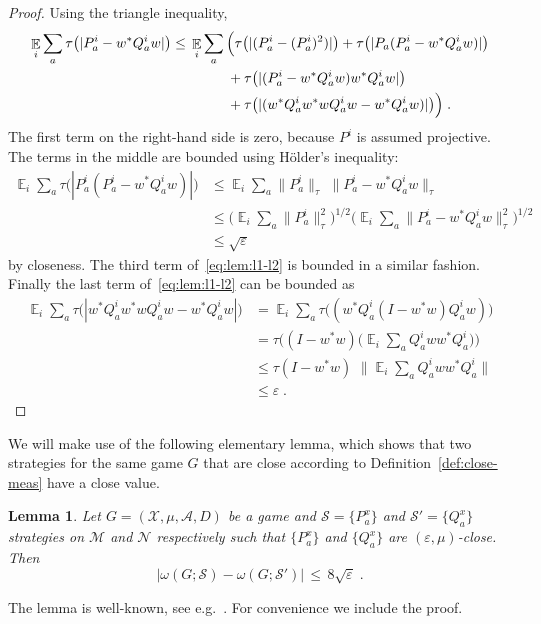 \documentclass[11pt]{article}
\newtheorem{lemma}[theorem]{Lemma}
\theoremstyle{definition}
\newcommand{\strategy}{\mathscr{S}}
\DeclareMathOperator*{\Expectation}{\mathbb{E}}
\newcommand{\Es}[1]{\Expectation_{#1}}
\newcommand{\mA}{\ensuremath{\mathcal{A}}}
\newcommand{\mM}{\ensuremath{\mathcal{M}}}
\newcommand{\mX}{\ensuremath{\mathcal{X}}}
\newcommand{\eps}{\varepsilon}
\newcommand{\mN}{\mathcal{N}}
\begin{document}
\begin{proof}
Using the triangle inequality, 
\begin{align}
\Es{i} \sum_a \tau\big(|P^i_a - w^* Q^i_a w|\big) &\leq\, \Es{i}\sum_a \Big(\tau\big(|(P^i_a-(P^i_a)^2)|\big) + \tau\big(|P_a(P^i_a-w^*Q^i_aw)|\big) \notag\\
&\qquad\qquad+ \tau\big(|(P^i_a-w^*Q^i_aw)w^*Q^i_aw|\big) \notag \\
&\qquad \qquad+\tau\big(| (w^*Q^i_aw^*wQ^i_aw-w^*Q^i_aw)|\big)\Big)\;. \label{eq:lem:l1-l2}
\end{align}
The first term on the right-hand side is zero, because $P^i$ is assumed projective. The terms in the middle are bounded using H\"older's inequality:
\begin{align*}
\Es{i}\sum_a  \tau\big(|P^i_a(P^i_a-w^*Q^i_aw)|\big) &\leq \Es{i} \sum_a \|P^i_a\|_\tau \, \, \|P^i_a-w^*Q^i_aw\|_\tau\\
&\leq \Big(\Es{i}\sum_a \|P^i_a\|_\tau^2\Big)^{1/2}\Big( \Es{i}\sum_a  \|P^i_a-w^*Q^i_aw\|_\tau^2 \Big)^{1/2}\\
&\leq \sqrt{\eps}
\end{align*}
by closeness. The third term of~\eqref{eq:lem:l1-l2} is bounded in a similar fashion.
Finally the last term of~\eqref{eq:lem:l1-l2} can be bounded as 
\begin{align*}
\Es{i}\sum_a \tau\big(| w^*Q^i_aw^*wQ^i_aw-w^*Q^i_aw|\big) &= \Es{i}\sum_a \tau\big( (w^*Q^i_a(I - w^*w)Q^i_aw)\big)\\
&=  \tau\Big( (I-w^*w)\Big(\Es{i}\sum_a Q^i_aww^* Q^i_a\Big)\Big)\\
&\leq \tau(I-w^*w) \,\, \Big\|\Es{i}\sum_a Q^i_aww^* Q^i_a\Big\|\\
&\leq \eps\;.
\end{align*}
\end{proof}


We will make use of the following elementary lemma, which shows that two strategies for the same game $G$ that are close according to Definition~\ref{def:close-meas} have a close value. 

\begin{lemma}\label{lem:close-value}
Let $G=(\mX,\mu,\mA,D)$ be a game and $\strategy=\{P^x_a\}$ and $\strategy'=\{Q^x_a\}$ strategies on $\mM$ and $\mN$ respectively such that $\{P^x_a\}$ and $\{Q^x_a\}$ are $(\eps,\mu)$-close. Then 
\[ \big|\omega(G;\strategy) - \omega(G;\strategy')\big|\,\leq\, 8\sqrt{\eps} \;.\]
\end{lemma}

The lemma is well-known, see e.g.~\cite[Lemma 5.28]{ji2020mip}. For convenience we include the proof. 
\end{document}
